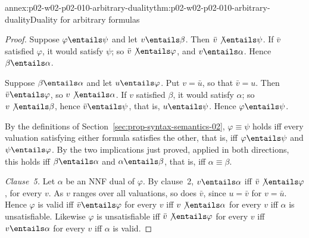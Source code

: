 \begin{annexitem}{annex:p02-w02-p02-010-arbitrary-duality}{thm:p02-w02-p02-010-arbitrary-duality}{Duality for arbitrary formulas}
\begin{proof}
Suppose \(\varphi\entails\psi\) and let \(v\entails\beta\).  Then
\(\bar v\not\entails\psi\).  If \(\bar v\) satisfied \(\varphi\), it would
satisfy \(\psi\); so \(\bar v\not\entails\varphi\), and \(v\entails\alpha\).
Hence \(\beta\entails\alpha\).

Suppose \(\beta\entails\alpha\) and let \(u\entails\varphi\).  Put
\(v=\bar u\), so that \(\bar v=u\).  Then \(\bar v\entails\varphi\), so
\(v\not\entails\alpha\).  If \(v\) satisfied \(\beta\), it would satisfy
\(\alpha\); so \(v\not\entails\beta\), hence \(\bar v\entails\psi\), that is,
\(u\entails\psi\).  Hence \(\varphi\entails\psi\).

By the definitions of Section~\ref{sec:prop-syntax-semantics-02},
\(\varphi\equiv\psi\) holds iff every valuation satisfying either formula
satisfies the other, that is, iff \(\varphi\entails\psi\) and
\(\psi\entails\varphi\).  By the two implications just proved, applied in both
directions, this holds iff \(\beta\entails\alpha\) and
\(\alpha\entails\beta\), that is, iff \(\alpha\equiv\beta\).

\emph{Clause~5.}  Let \(\alpha\) be an NNF dual of \(\varphi\).  By clause~2,
\(v\entails\alpha\) iff \(\bar v\not\entails\varphi\), for every \(v\).  As
\(v\) ranges over all valuations, so does \(\bar v\), since \(u=\bar v\) for
\(v=\bar u\).  Hence \(\varphi\) is valid iff \(\bar v\entails\varphi\) for
every \(v\) iff \(v\not\entails\alpha\) for every \(v\) iff \(\alpha\) is
unsatisfiable.  Likewise \(\varphi\) is unsatisfiable iff
\(\bar v\not\entails\varphi\) for every \(v\) iff \(v\entails\alpha\) for every
\(v\) iff \(\alpha\) is valid.
\end{proof}
\end{annexitem}

